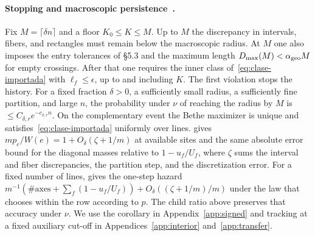 \paragraph{Stopping and macroscopic persistence~\cite[Def.~2.2, \S4 and Cor.~4.12]{tc}.} Fix
\(M=\lceil\delta n\rceil\) and a floor \(K_0\le K\le M\). Up to \(M\) the discrepancy in intervals,
fibers, and rectangles must remain below the macroscopic radius. At \(M\) one also imposes the entry
tolerances of §5.3 and the maximum length \(D_{\max}(M)<\alpha_{\rm geo}M\) for empty crossings. After
that one requires the inner class of~\eqref{eq:clase-importada} with \(\ell_f\le\epsilon\), up to and
including \(K\). The first violation stops the history. For a fixed fraction \(\delta>0\), a sufficiently
small radius, a sufficiently fine partition, and large \(n\), the probability under \(\nu\) of reaching
the radius by \(M\) is \(\le C_{\delta,r}e^{-c_{\delta,r}n}\). On the complementary event the Bethe
maximizer is unique and satisfies~\eqref{eq:clase-importada} uniformly over lines. \cite[\S4.3, (4.3)]{tc}
gives \(mp_e/W(e)=1+O_\delta(\zeta+1/m)\) at available sites and the same absolute error bound for the
diagonal masses relative to \(1-u_f/U_f\), where \(\zeta\) sums the interval and fiber discrepancies, the
partition step, and the discretization error. For a fixed number of lines, \cite[Lemma~4.10]{tc} gives the
one-step hazard \(m^{-1}(\#\text{axes}+\sum_f(1-u_f/U_f))+O_\delta((\zeta+1/m)/m)\) under the law that
chooses within the row according to \(p\). The child ratio above preserves that accuracy under \(\nu\). We
use the corollary in Appendix~\ref{app:signed} and tracking at a fixed auxiliary cut-off in
Appendices~\ref{app:interior} and~\ref{app:transfer}.

